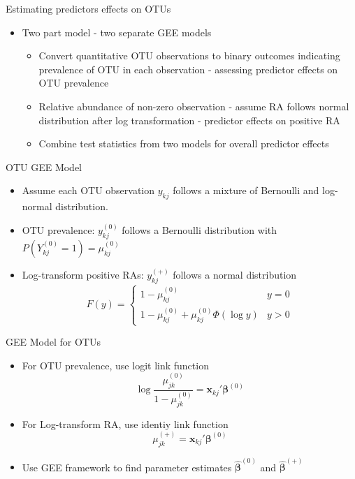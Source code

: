 \documentclass{beamer}
\begin{document}
\begin{frame}[t]{Estimating predictors effects on OTUs}
  \begin{itemize}
    \item Two part model - two separate GEE models
    \begin{itemize}
      \item Convert quantitative OTU observations to binary outcomes indicating prevalence of OTU in each observation - assessing predictor effects on OTU prevalence
      \item Relative abundance of non-zero observation - assume RA follows normal distribution after log transformation - predictor effects on positive RA
      \item Combine test statistics from two models for overall predictor effects
    \end{itemize}
  \end{itemize}
\end{frame}

\begin{frame}[t]{OTU GEE Model}
  \begin{itemize}
    \item Assume each OTU observation $y_{kj}$ follows a mixture of Bernoulli and log-normal distribution.
    \item OTU prevalence: $y_{kj}^{(0)}$ follows a Bernoulli distribution with $P(Y_{kj}^{(0)} = 1) = \mu_{kj}^{(0)}$
    \item Log-transform positive RAs: $y_{kj}^{(+)}$ follows a normal distribution
    $$F(y)
       =
      \begin{cases}
           1 - \mu_{kj}^{(0)}&  y = 0\\
           1 - \mu_{kj}^{(0)} + \mu_{kj}^{(0)}\Phi(\log y)& y > 0
      \end{cases}
    $$
  \end{itemize}
\end{frame}

\begin{frame}[t]{GEE Model for OTUs}
  \begin{itemize}
    \item For OTU prevalence, use logit link function
    $$\log \frac{\mu_{jk}^{(0)}}{ 1 - \mu_{jk}^{(0)}} = \boldsymbol x_{kj}' \boldsymbol \beta^{(0)}$$
    \item For Log-transform RA, use identiy link function
    $$\mu_{jk}^{(+)} = \boldsymbol x_{kj}'\boldsymbol \beta^{(0)}$$
    \item Use GEE framework to find parameter estimates $\hat{\boldsymbol\beta}^{(0)}$ and $\hat{\boldsymbol\beta}^{(+)}$
  \end{itemize}
\end{frame}
\end{document}
